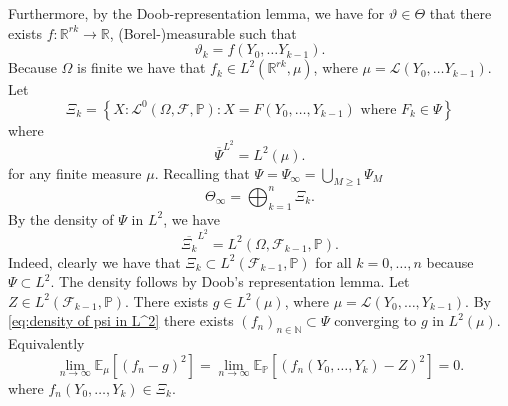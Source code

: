 \documentclass[11pt,a4paper,twoside,openany]{report}
\theoremstyle{plain} %
\theoremstyle{definition} %
\theoremstyle{remark} %
\begin{document}
    Furthermore, by the Doob-representation lemma, we have for \(\vartheta\in\Theta\) that there exists \(f:\mathbb{R}^{rk}\to\mathbb{R}\),  (Borel-)measurable such that
    \begin{equation}
        \vartheta_k=f(Y_0,\dots Y_{k-1}).
    \end{equation}
    Because \(\Omega\) is finite we have that \(f_k\in L^2(\mathbb{R}^{rk},\mu)\), where \(\mu=\mathcal{L}(Y_0,\dots Y_{k-1})\).
    Let
    \begin{equation}
        \Xi_k=\left\{X:\mathcal{L}^0(\Omega,\mathcal{F},\mathbb{P}):X=F(Y_0,\dots,Y_{k-1})\text{ where } F_k\in\Psi\right\}
    \end{equation}
    where 
    \begin{equation}\label{eq:density of psi in L^2}
        \overline{\Psi}^{L^2}=L^2(\mu).
    \end{equation}
    for any finite measure \(\mu\).
    Recalling that \(\Psi=\Psi_{\infty}=\bigcup_{M\geq 1}\Psi_M\)
    \begin{equation}
        \Theta_{\infty}=\bigoplus_{k=1}^{n}\Xi_k.
    \end{equation}
    By the density of \(\Psi\) in \(L^2\), we have 
    \begin{equation}
    \overline{\Xi_k}^{L^2}=L^2(\Omega,\mathcal{F}_{k-1},\mathbb{P}).
    \end{equation}
    Indeed, clearly we have that \(\Xi_k\subset L^2(\mathcal{F}_{k-1},\mathbb{P})\) for all \(k=0,\dots,n\) because \(\Psi\subset L^2\). The density follows by Doob's representation lemma. Let \(Z\in L^2(\mathcal{F}_{k-1},\mathbb{P})\). There exists \(g\in L^2(\mu)\), where \(\mu=\mathcal{L}(Y_0,\dots,Y_{k-1})\). By \cref{eq:density of psi in L^2} there exists \((f_n)_{n\in\mathbb{N}}\subset\Psi\) converging to \(g\) in \(L^2(\mu)\). Equivalently
    \begin{equation}
        \lim_{n\to\infty}\mathbb{E}_{\mu}[(f_n-g)^2]=\lim_{n\to\infty}\mathbb{E}_{\mathbb{P}}[(f_n(Y_0,\dots,Y_k)-Z)^2]=0.
    \end{equation}
    where \(f_n(Y_0,\dots,Y_k)\in\Xi_k\).
\end{document}
